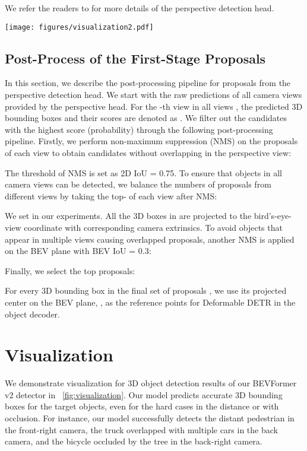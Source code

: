 \documentclass[10pt,twocolumn,letterpaper]{article}
\begin{document}
We refer the readers to \cite{DD3D} for more details of the perspective detection head.


\begin{figure*}[t]
    \centering
    \texttt{[image: figures/visualization2.pdf]}
    \caption{Visualization of BEVFormer v2 3D object detection predictions.}
    \label{fig:visualization}
\end{figure*}

\subsection{Post-Process of the First-Stage Proposals}
In this section, we describe the post-processing pipeline for proposals from the perspective detection head. 
We start with the raw predictions of all camera views provided by the perspective head. 
For the -th view in all views , the predicted 3D bounding boxes and their scores are denoted as .
We filter out the candidates with the highest score (probability) through the following post-processing pipeline. 
Firstly, we perform non-maximum suppression (NMS) on the proposals of each view  to obtain candidates  without overlapping in the perspective view:

The threshold of NMS is set as 2D IoU = 0.75. To ensure that objects in all camera views can be detected, we balance the numbers of proposals from different views by taking the top- of each view  after NMS:

We set  in our experiments. 
All the 3D boxes in  are projected to the bird's-eye-view coordinate with corresponding camera extrinsics. 
To avoid objects that appear in multiple views causing overlapped proposals, another NMS is applied on the BEV plane with BEV IoU = 0.3: 

Finally, we select the top  proposals: 

For every 3D bounding box  in the final set of proposals , we use its projected center on the BEV plane, , as the reference points for Deformable DETR in the object decoder. 


\section{Visualization}
We demonstrate visualization for 3D object detection results of our BEVFormer v2 detector in ~\cref{fig:visualization}. Our model predicts accurate 3D bounding boxes for the target objects, even for the hard cases in the distance or with occlusion. For instance, our model successfully detects the distant pedestrian in the front-right camera, the truck overlapped with multiple cars in the back camera, and the bicycle occluded by the tree in the back-right camera.



%
 
\end{document}
